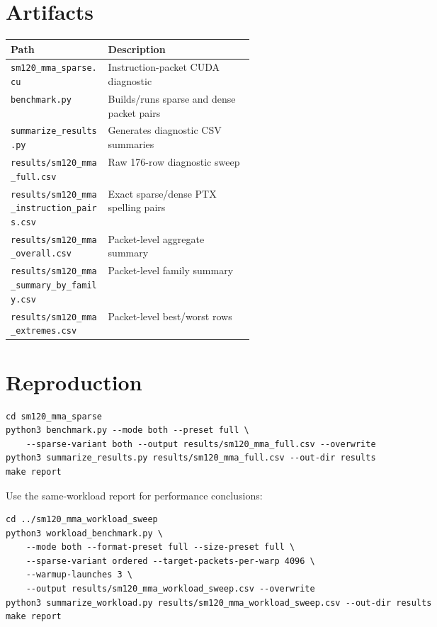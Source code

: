 \documentclass[10pt]{article}
\begin{document}
\section{Artifacts}

\begin{center}
\small
\begin{tabularx}{\linewidth}{L{0.40\linewidth}Y}
\toprule
Path & Description \\
\midrule
\texttt{sm120\_mma\_sparse.cu} & Instruction-packet CUDA diagnostic \\
\texttt{benchmark.py} & Builds/runs sparse and dense packet pairs \\
\texttt{summarize\_results.py} & Generates diagnostic CSV summaries \\
\texttt{results/sm120\_mma\_full.csv} & Raw 176-row diagnostic sweep \\
\texttt{results/sm120\_mma\_instruction\_pairs.csv} & Exact sparse/dense PTX spelling pairs \\
\texttt{results/sm120\_mma\_overall.csv} & Packet-level aggregate summary \\
\texttt{results/sm120\_mma\_summary\_by\_family.csv} & Packet-level family summary \\
\texttt{results/sm120\_mma\_extremes.csv} & Packet-level best/worst rows \\
\bottomrule
\end{tabularx}
\end{center}

\section{Reproduction}

\begin{verbatim}
cd sm120_mma_sparse
python3 benchmark.py --mode both --preset full \
    --sparse-variant both --output results/sm120_mma_full.csv --overwrite
python3 summarize_results.py results/sm120_mma_full.csv --out-dir results
make report
\end{verbatim}

Use the same-workload report for performance conclusions:

\begin{verbatim}
cd ../sm120_mma_workload_sweep
python3 workload_benchmark.py \
    --mode both --format-preset full --size-preset full \
    --sparse-variant ordered --target-packets-per-warp 4096 \
    --warmup-launches 3 \
    --output results/sm120_mma_workload_sweep.csv --overwrite
python3 summarize_workload.py results/sm120_mma_workload_sweep.csv --out-dir results
make report
\end{verbatim}
\end{document}
